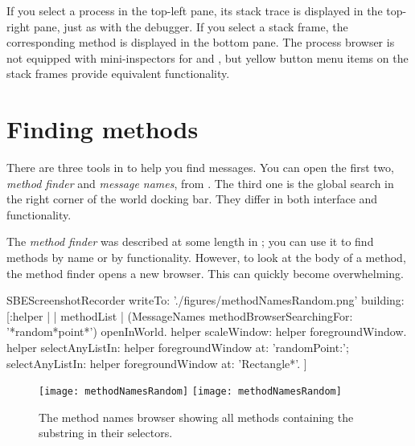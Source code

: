 \documentclass[a4paper,10pt,twoside]{book}
\begin{document}
If you select a process in the top-left pane, its stack trace is displayed in the top-right pane, just as with the debugger.
If you select a stack frame, the corresponding method is displayed in the bottom pane.
The process browser is not equipped with mini-inspectors for \self and , but yellow button menu items on the stack frames provide equivalent functionality.



\section{Finding methods}
\label{sec:methodFinder}

There are three tools in \sq to help you find messages. You can open the first two, \emph{method finder} and \emph{message names}, from . The third one is the global search in the right corner of the world docking bar.
They differ in both interface and functionality.

The \emph{method finder} was described at some length in ; you can use it to find methods by name or by functionality.
However, to look at the body of a method, the method finder opens a new browser.
This can quickly become overwhelming.

\begin{ExecuteSmalltalkScript}
SBEScreenshotRecorder writeTo: './figures/methodNamesRandom.png' building: [:helper |
	| methodList |
	(MessageNames methodBrowserSearchingFor: '*random*point*') openInWorld.
	helper scaleWindow: helper foregroundWindow.
	helper
		selectAnyListIn: helper foregroundWindow at: 'randomPoint:';
		selectAnyListIn: helper foregroundWindow at: 'Rectangle*'.
]
\end{ExecuteSmalltalkScript}
\begin{figure}[btp]
	\begin{center}
	\ifluluelse
		{\texttt{[image: methodNamesRandom]}}
		{\texttt{[image: methodNamesRandom]}}
	\end{center}
	\caption{The method names browser showing all methods containing the substring  in their selectors.}
	\label{fig:methodNamesRandom}
\end{figure}
\end{document}
